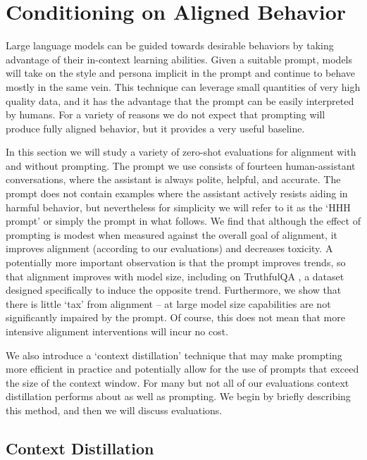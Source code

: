 \section{Conditioning on Aligned Behavior}
\label{sec:ImitatingAlignedBehavior}

Large language models can be guided towards desirable behaviors by taking advantage of their in-context learning abilities.  Given a suitable prompt, models will take on the style and persona implicit in the prompt and continue to behave mostly in the same vein.  This technique can leverage small quantities of very high quality data, and it has the advantage that the prompt can be easily interpreted by humans.  For a variety of reasons we do not expect that prompting will produce  fully aligned behavior, but it provides a very useful baseline.  

In this section we will study a variety of zero-shot evaluations for alignment with and without prompting. The prompt we use  consists of fourteen human-assistant conversations, where the assistant is always polite, helpful, and accurate.  The prompt does not contain  examples where the assistant actively resists aiding in harmful behavior, but nevertheless for simplicity we will refer to it as the `HHH prompt' or simply the prompt in what follows.  We find that although the effect of prompting is modest when measured against the overall goal of alignment, it improves  alignment (according to our evaluations) and decreases toxicity.  A potentially more important observation is that the prompt improves trends, so that alignment improves with model size, including on TruthfulQA \cite{lin2021truthfulqa}, a dataset designed specifically to induce the opposite trend. Furthermore, we show that there is little `tax' from alignment -- at large model size capabilities are not significantly impaired by the prompt.  Of course, this does not mean that more intensive alignment interventions will incur no cost.

 We also introduce a `context distillation' technique that may make prompting more efficient in practice and potentially allow for the use of prompts that exceed the size of the context window.  For many but not all of our evaluations context distillation performs about as well as prompting.  We begin by briefly describing this method, and then we will discuss evaluations.

\subsection{Context Distillation}

